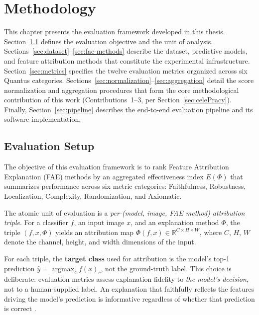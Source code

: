 \chapter{Methodology}
\label{ch:methodology}

This chapter presents the evaluation framework developed in this thesis.
Section~\ref{sec:eval-setup} defines the evaluation objective and the unit of
analysis. Sections~\ref{sec:dataset}--\ref{sec:fae-methods} describe the
dataset, predictive models, and feature attribution methods that constitute
the experimental infrastructure. Section~\ref{sec:metrics} specifies the
twelve evaluation metrics organized across six Quantus categories.
Sections~\ref{sec:normalization}--\ref{sec:aggregation} detail the score
normalization and aggregation procedures that form the core methodological
contribution of this work (Contributions~1--3, per
Section~\ref{sec:celePracy}). Finally, Section~\ref{sec:pipeline} describes
the end-to-end evaluation pipeline and its software implementation.

\section{Evaluation Setup}
\label{sec:eval-setup}

The objective of this evaluation framework is to rank Feature Attribution
Explanation (FAE) methods by an aggregated effectiveness index
$E(\Phi)$ that summarizes performance across six metric categories:
Faithfulness, Robustness, Localization, Complexity, Randomization, and
Axiomatic.

The atomic unit of evaluation is a \emph{per-(model, image, FAE method)
attribution triple}. For a classifier $f$, an input image $x$, and an
explanation method $\Phi$, the triple $(f, x, \Phi)$ yields an attribution
map $\Phi(f, x) \in \mathbb{R}^{C \times H \times W}$, where $C$, $H$, $W$
denote the channel, height, and width dimensions of the input.

For each triple, the \textbf{target class} used for attribution is the
model's top-1 prediction $\hat{y} = \operatorname{argmax}_c f(x)_c$, not
the ground-truth label. This choice is deliberate: evaluation metrics assess
explanation fidelity to \emph{the model's decision}, not to a human-supplied
label. An explanation that faithfully reflects the features driving the
model's prediction is informative regardless of whether that prediction is
correct \cite{hedstrom2023quantus}.

